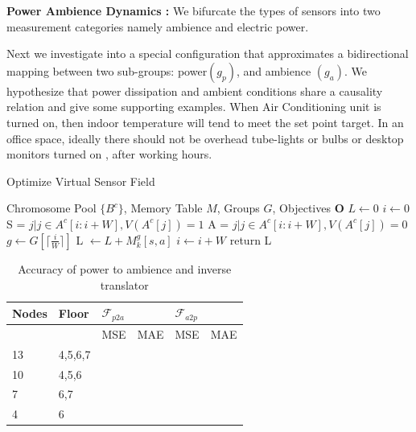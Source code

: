  
\textbf{Power Ambience Dynamics : }
We bifurcate the types of sensors into two measurement categories namely ambience and electric power.


Next we investigate into a special configuration that approximates a bidirectional mapping between two sub-groups: power$(g_p)$, and ambience $(g_a)$.
We hypothesize that power dissipation and ambient conditions share a causality relation and give some supporting examples.
When Air Conditioning unit is turned on, then indoor temperature will tend to meet the set point target.
In an office space, ideally there should not be overhead tube-lights or bulbs or desktop monitors turned on , after working hours.

 

\begin{algorithm}
\caption{Optimize Virtual Sensor Field }\label{alg:chromAccuracy}
\begin{algorithmic}
\Require Chromosome Pool $\{B^c\}$, Memory Table $M$, Groups $G$, Objectives \textbf{O}
\State $L \gets 0$
\State $i \gets 0$
\State 
{} 
 
\State S = ${j | j \in A^c[i:i+W], V( A^c[j])=1}$
\State A = ${j | j \in A^c[i:i+W], V( A^c[j])=0}$
\State $g \gets G[\lceil{\frac{i}{W}} \rceil]$ 
\State L $ \gets L + M_k^g[s,a]$
\EndFor
\EndFor
\State $i \gets i + W$
\EndWhile
\EndFor
\State return L
\end{algorithmic}
\end{algorithm}


\begin{table}[]
\begin{tabular}{|l|l|l|l|l|l|}
\hline
Nodes     & Floor      & \multicolumn{2}{l|}{$\mathcal{F}_{p2a}$ } & \multicolumn{2}{l|}{$\mathcal{F}_{a2p}$  } \\ \hline
\multicolumn{2}{|l|}{} & MSE           & MAE          & MSE           & MAE          \\ \hline
13        & 4,5,6,7    &               &              &               &              \\ \hline
10        & 4,5,6      &               &              &               &              \\ \hline
7         & 6,7        &               &              &               &              \\ \hline
4         & 6          &               &              &               &              \\ \hline
\end{tabular}
\caption{Accuracy of power to ambience and inverse translator }
\label{table:translators}
\end{table}

